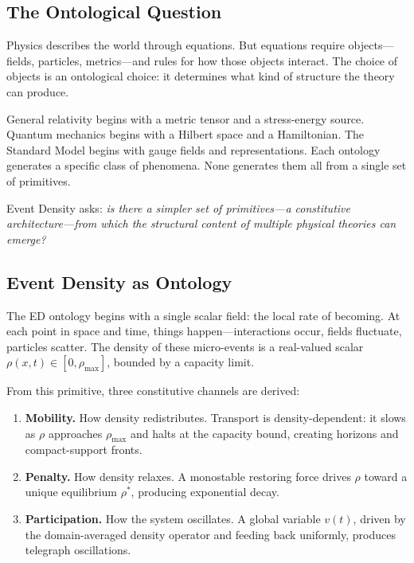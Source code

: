 \documentclass[12pt,letterpaper]{article}
\begin{document}
\subsection{The Ontological Question}

Physics describes the world through equations. But equations require objects---fields, particles, metrics---and rules for how those objects interact. The choice of objects is an ontological choice: it determines what kind of structure the theory can produce.

General relativity begins with a metric tensor and a stress-energy source. Quantum mechanics begins with a Hilbert space and a Hamiltonian. The Standard Model begins with gauge fields and representations. Each ontology generates a specific class of phenomena. None generates them all from a single set of primitives.

Event Density asks: \emph{is there a simpler set of primitives---a constitutive architecture---from which the structural content of multiple physical theories can emerge?}

\subsection{Event Density as Ontology}

The ED ontology begins with a single scalar field: the local rate of becoming. At each point in space and time, things happen---interactions occur, fields fluctuate, particles scatter. The density of these micro-events is a real-valued scalar $\rho(x,t) \in [0, \rho_{\max}]$, bounded by a capacity limit.

From this primitive, three constitutive channels are derived:

\begin{enumerate}[leftmargin=2em]
\item \textbf{Mobility.} How density redistributes. Transport is density-dependent: it slows as $\rho$ approaches $\rho_{\max}$ and halts at the capacity bound, creating horizons and compact-support fronts.
\item \textbf{Penalty.} How density relaxes. A monostable restoring force drives $\rho$ toward a unique equilibrium $\rho^*$, producing exponential decay.
\item \textbf{Participation.} How the system oscillates. A global variable $v(t)$, driven by the domain-averaged density operator and feeding back uniformly, produces telegraph oscillations.
\end{enumerate}
\end{document}
